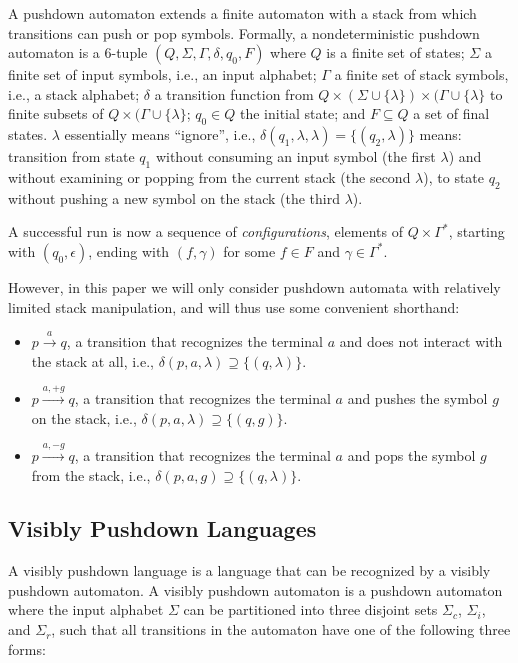 \documentclass[acmsmall,review,anonymous]{acmart}\settopmatter{printfolios=true,printccs=false,printacmref=false}
\newcommand{\T}{\Sigma} %
\begin{document}
A pushdown automaton extends a finite automaton with a stack from which transitions can push or pop symbols. Formally, a nondeterministic pushdown automaton is a 6-tuple $(Q, \T, \Gamma, \delta, q_0, F)$ where $Q$ is a finite set of states; $\T$ a finite set of input symbols, i.e., an input alphabet; $\Gamma$ a finite set of stack symbols, i.e., a stack alphabet; $\delta$ a transition function from $Q \times (\T \cup \{\lambda\}) \times (\Gamma \cup \{\lambda\}$ to finite subsets of $Q \times (\Gamma \cup \{\lambda\}$; $q_0 \in Q$ the initial state; and $F \subseteq Q$ a set of final states. $\lambda$ essentially means ``ignore'', i.e., $\delta(q_1, \lambda, \lambda) = \{(q_2, \lambda)\}$ means: transition from state $q_1$ without consuming an input symbol (the first $\lambda$) and without examining or popping from the current stack (the second $\lambda$), to state $q_2$ without pushing a new symbol on the stack (the third $\lambda$).

A successful run is now a sequence of \emph{configurations}, elements of $Q \times \Gamma^{*}$, starting with $(q_0, \epsilon)$, ending with $(f, \gamma)$ for some $f \in F$ and $\gamma \in \Gamma^{*}$.

However, in this paper we will only consider pushdown automata with relatively limited stack manipulation, and will thus use some convenient shorthand:

\begin{itemize}
\item $p \xrightarrow{a} q$, a transition that recognizes the terminal $a$ and does not interact with the stack at all, i.e., $\delta(p, a, \lambda) \supseteq \{(q, \lambda)\}$.
\item $p \xrightarrow{a, +g} q$, a transition that recognizes the terminal $a$ and pushes the symbol $g$ on the stack, i.e., $\delta(p, a, \lambda) \supseteq \{(q, g)\}$.
\item $p \xrightarrow{a, -g} q$, a transition that recognizes the terminal $a$ and pops the symbol $g$ from the stack, i.e., $\delta(p, a, g) \supseteq \{(q, \lambda)\}$.
\end{itemize}

\subsection{Visibly Pushdown Languages} \label{sec:preliminaries-vpls}

A visibly pushdown language \cite{alurVisiblyPushdownLanguages2004} is a language that can be recognized by a visibly pushdown automaton. A visibly pushdown automaton is a pushdown automaton where the input alphabet $\T$ can be partitioned into three disjoint sets $\T_c$, $\T_i$, and $\T_r$, such that all transitions in the automaton have one of the following three forms:
\end{document}
